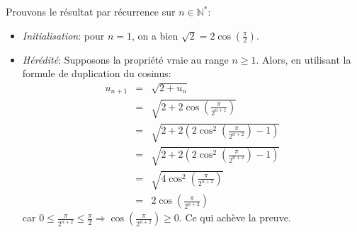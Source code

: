 Prouvons le résultat par récurrence sur $n\in\mathbb{N}^*$:
\begin{itemize}
  \item \textit{Initialisation}: pour $n=1$, on a bien $\sqrt{2}=2\cos\left(\frac{\pi}{2}\right)$.
  \item \textit{Hérédité}: Supposons la propriété vraie au range $n\geq 1$. Alors, en utilisant la formule de duplication du cosinus:
  \begin{eqnarray*}
    u_{n+1} &=& \sqrt{2+u_n} \\
            &=& \sqrt{2+2\cos\left(\frac{\pi}{2^{n+1}}\right)} \\
            &=& \sqrt{2+2\left( 2\cos^2\left(\frac{\pi}{2^{n+2}}\right) -1\right)} \\
            &=& \sqrt{2+2\left( 2\cos^2\left(\frac{\pi}{2^{n+2}}\right) -1\right)} \\
            &=& \sqrt{ 4\cos^2\left(\frac{\pi}{2^{n+2}}\right)} \\
            &=& 2\cos\left(\frac{\pi}{2^{n+2}}\right) 
  \end{eqnarray*}
  car $0\leq \frac{\pi}{2^{n+2}} \leq \frac{\pi}{2} \Rightarrow \cos\left(\frac{\pi}{2^{n+2}}\right) \geq 0$. Ce qui achève la preuve.
\end{itemize}
